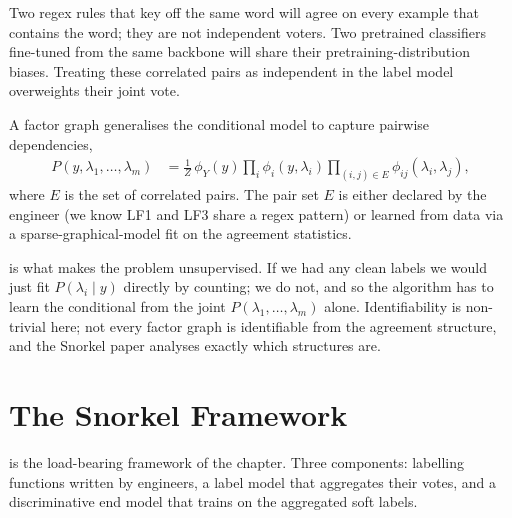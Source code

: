  Two regex rules that key off the same word will agree on every example that contains the word; they are not independent voters. Two pretrained classifiers fine-tuned from the same backbone will share their pretraining-distribution biases. Treating these correlated pairs as independent in the label model overweights their joint vote.

A factor graph generalises the conditional model to capture pairwise dependencies,
\begin{align*}
    P(y, \lambda_1, \ldots, \lambda_m) &= \tfrac{1}{Z}\, \phi_Y(y) \prod_i \phi_i(y, \lambda_i) \prod_{(i,j) \in E} \phi_{ij}(\lambda_i, \lambda_j),
\end{align*}
where $E$ is the set of correlated pairs. The pair set $E$ is either declared by the engineer (we know LF1 and LF3 share a regex pattern) or learned from data via a sparse-graphical-model fit on the agreement statistics.

 is what makes the problem unsupervised. If we had any clean labels we would just fit $P(\lambda_i \mid y)$ directly by counting; we do not, and so the algorithm has to learn the conditional from the joint $P(\lambda_1, \ldots, \lambda_m)$ alone. Identifiability is non-trivial here; not every factor graph is identifiable from the agreement structure, and the Snorkel paper analyses exactly which structures are.


\newpage
\section{The Snorkel Framework}


 is the load-bearing framework of the chapter. Three components: labelling functions written by engineers, a label model that aggregates their votes, and a discriminative end model that trains on the aggregated soft labels.

